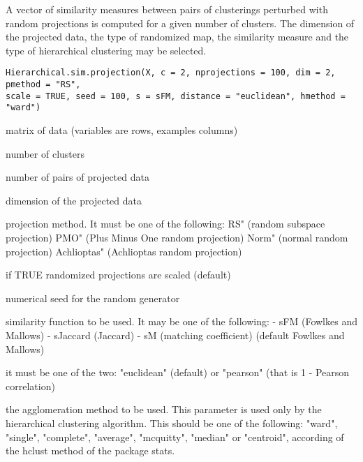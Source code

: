 \documentclass{article}
\begin{document}
\begin{Description}\relax
A vector of similarity measures between pairs of clusterings perturbed with random projections is computed for a given number of clusters. 
The dimension of the projected
data, the type of randomized map, the similarity measure and  the type of hierarchical clustering may be selected.
\end{Description}
\begin{Usage}
\begin{verbatim}
Hierarchical.sim.projection(X, c = 2, nprojections = 100, dim = 2, pmethod = "RS", 
scale = TRUE, seed = 100, s = sFM, distance = "euclidean", hmethod = "ward")
\end{verbatim}
\end{Usage}
\begin{Arguments}
\begin{ldescription}
\item[\code{X}] matrix of data (variables are rows, examples columns) 
\item[\code{c}] number of clusters 
\item[\code{nprojections}] number of pairs of projected data 
\item[\code{dim}] dimension of the projected data 
\item[\code{pmethod}] projection method. It must be one of the following:  
RS" (random subspace projection)
PMO" (Plus Minus One random projection)
Norm" (normal random projection)
Achlioptas" (Achlioptas random projection)
\item[\code{scale}] if TRUE randomized projections are scaled (default) 
\item[\code{seed}] numerical seed for the random generator 
\item[\code{s}] similarity function to be used. It may be one of the following: 
- sFM (Fowlkes and Mallows)
- sJaccard (Jaccard)
- sM (matching coefficient)
(default Fowlkes and Mallows) 
\item[\code{distance}] it must be one of the two: "euclidean" (default) or "pearson" (that is 1 - Pearson correlation) 
\item[\code{hmethod}] the agglomeration method to be used. This parameter is used only by the hierarchical clustering algorithm.
This should be one of the following:
"ward", "single", "complete", "average", "mcquitty", "median" or "centroid", according of the hclust
method of the package stats. 
\end{ldescription}
\end{Arguments}
\end{document}
